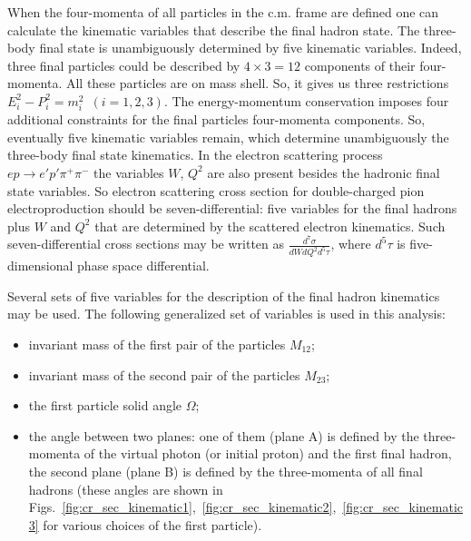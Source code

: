 When the four-momenta of all particles in the c.m. frame are defined one can calculate the kinematic variables that describe the final hadron state.
The three-body final state is 
unambiguously determined by five kinematic
variables. Indeed, three final particles could be
described by $4 \times 3 = 12$ components of
their four-momenta. All these particles are
on mass shell. So, it gives us three restrictions
$E_{i}^{2} -P_{i}^{2} =
m_{i}^{2}$~$(i=1,2,3)$. The energy-momentum
conservation imposes four additional constraints
for the final particles four-momenta
components. So, eventually five
kinematic variables remain, which determine
unambiguously the three-body final state
kinematics. In the electron scattering process $e
p \rightarrow e' p' \pi^{+} \pi^{-}$ 
the variables $W$, $Q^{2}$ are also present besides
the hadronic final state variables. So
electron scattering cross section for double-charged pion electroproduction should be
seven-differential: five variables for the final
hadrons plus $W$ and $Q^{2}$ that are determined by the
scattered electron kinematics. Such
seven-differential cross sections may be
written as
$\frac{d^{7}\sigma}{dWdQ^{2}d^{5}\tau}$,
where $d^{5}\tau$ is five-dimensional phase space differential.

Several sets of five variables for
the description of the final hadron kinematics may
be used. The following generalized set of
variables is used in this analysis:
\begin{itemize}
\item invariant mass of the first pair of the
particles $M_{12}$;
\item invariant mass of the second pair of the
particles $M_{23}$;
\item the first particle solid angle $\Omega$;
\item the angle between two planes: one of
them (plane A) is defined by the three-momenta of
the virtual photon (or initial proton) and the first final hadron, the second
plane (plane B) is defined by the three-momenta of all final hadrons (these angles are shown in  Figs.~\ref{fig:cr_sec_kinematic1},~\ref{fig:cr_sec_kinematic2},~\ref{fig:cr_sec_kinematic3} for various choices of the first particle).
\end{itemize}

